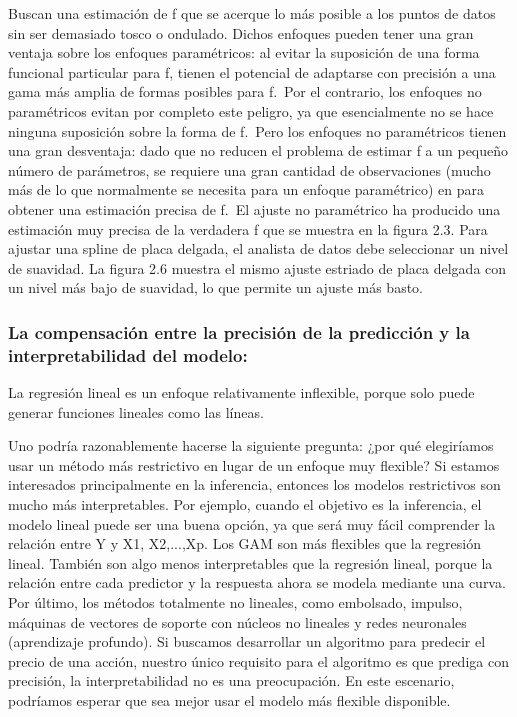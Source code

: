 \documentclass[
  letterpaper,
  DIV=11,
  numbers=noendperiod]{scrartcl}
\begin{document}
Buscan una estimación de f que se acerque lo más posible a los puntos de
datos sin ser demasiado tosco o ondulado. Dichos enfoques pueden tener
una gran ventaja sobre los enfoques paramétricos: al evitar la
suposición de una forma funcional particular para f, tienen el potencial
de adaptarse con precisión a una gama más amplia de formas posibles para
f.~Por el contrario, los enfoques no paramétricos evitan por completo
este peligro, ya que esencialmente no se hace ninguna suposición sobre
la forma de f.~Pero los enfoques no paramétricos tienen una gran
desventaja: dado que no reducen el problema de estimar f a un pequeño
número de parámetros, se requiere una gran cantidad de observaciones
(mucho más de lo que normalmente se necesita para un enfoque
paramétrico) en para obtener una estimación precisa de f.~El ajuste no
paramétrico ha producido una estimación muy precisa de la verdadera f
que se muestra en la figura 2.3. Para ajustar una spline de placa
delgada, el analista de datos debe seleccionar un nivel de suavidad. La
figura 2.6 muestra el mismo ajuste estriado de placa delgada con un
nivel más bajo de suavidad, lo que permite un ajuste más basto.

\hypertarget{la-compensaciuxf3n-entre-la-precisiuxf3n-de-la-predicciuxf3n-y-la-interpretabilidad-del-modelo}{%
\subsubsection{\texorpdfstring{\textbf{La compensación entre la
precisión de la predicción y la interpretabilidad del
modelo:}}{La compensación entre la precisión de la predicción y la interpretabilidad del modelo:}}\label{la-compensaciuxf3n-entre-la-precisiuxf3n-de-la-predicciuxf3n-y-la-interpretabilidad-del-modelo}}

La regresión lineal es un enfoque relativamente inflexible, porque solo
puede generar funciones lineales como las líneas.

Uno podría razonablemente hacerse la siguiente pregunta: ¿por qué
elegiríamos usar un método más restrictivo en lugar de un enfoque muy
flexible? Si estamos interesados principalmente en la inferencia,
entonces los modelos restrictivos son mucho más interpretables. Por
ejemplo, cuando el objetivo es la inferencia, el modelo lineal puede ser
una buena opción, ya que será muy fácil comprender la relación entre Y y
X1, X2,...,Xp. Los GAM son más flexibles que la regresión lineal.
También son algo menos interpretables que la regresión lineal, porque la
relación entre cada predictor y la respuesta ahora se modela mediante
una curva. Por último, los métodos totalmente no lineales, como
embolsado, impulso, máquinas de vectores de soporte con núcleos no
lineales y redes neuronales (aprendizaje profundo). Si buscamos
desarrollar un algoritmo para predecir el precio de una acción, nuestro
único requisito para el algoritmo es que prediga con precisión, la
interpretabilidad no es una preocupación. En este escenario, podríamos
esperar que sea mejor usar el modelo más flexible disponible.
\end{document}
